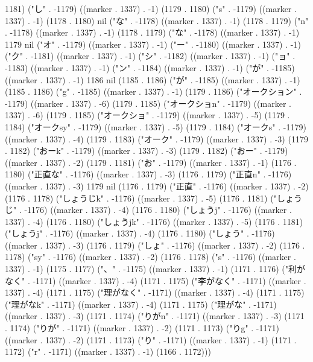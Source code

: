 1181) ("し" . -1179) ((marker . 1337) . -1) (1179 . 1180) ("s" . -1179) ((marker . 1337) . -1) (1178 . 1180) nil ("な" . -1178) ((marker . 1337) . -1) (1178 . 1179) ("n" . -1178) ((marker . 1337) . -1) (1178 . 1179) ("な" . -1178) ((marker . 1337) . -1) 1179 nil ("オ" . -1179) ((marker . 1337) . -1) ("ー" . -1180) ((marker . 1337) . -1) ("ク" . -1181) ((marker . 1337) . -1) ("シ" . -1182) ((marker . 1337) . -1) ("ョ" . -1183) ((marker . 1337) . -1) ("ン" . -1184) ((marker . 1337) . -1) ("が" . -1185) ((marker . 1337) . -1) 1186 nil (1185 . 1186) ("が" . -1185) ((marker . 1337) . -1) (1185 . 1186) ("g" . -1185) ((marker . 1337) . -1) (1179 . 1186) ("オークション" . -1179) ((marker . 1337) . -6) (1179 . 1185) ("オークショn" . -1179) ((marker . 1337) . -6) (1179 . 1185) ("オークショ" . -1179) ((marker . 1337) . -5) (1179 . 1184) ("オークsy" . -1179) ((marker . 1337) . -5) (1179 . 1184) ("オークs" . -1179) ((marker . 1337) . -4) (1179 . 1183) ("オーク" . -1179) ((marker . 1337) . -3) (1179 . 1182) ("おーk" . -1179) ((marker . 1337) . -3) (1179 . 1182) ("おー" . -1179) ((marker . 1337) . -2) (1179 . 1181) ("お" . -1179) ((marker . 1337) . -1) (1176 . 1180) ("正直な" . -1176) ((marker . 1337) . -3) (1176 . 1179) ("正直n" . -1176) ((marker . 1337) . -3) 1179 nil (1176 . 1179) ("正直" . -1176) ((marker . 1337) . -2) (1176 . 1178) ("しょうじk" . -1176) ((marker . 1337) . -5) (1176 . 1181) ("しょうじ" . -1176) ((marker . 1337) . -4) (1176 . 1180) ("しょうj" . -1176) ((marker . 1337) . -4) (1176 . 1180) ("しょうjk" . -1176) ((marker . 1337) . -5) (1176 . 1181) ("しょうj" . -1176) ((marker . 1337) . -4) (1176 . 1180) ("しょう" . -1176) ((marker . 1337) . -3) (1176 . 1179) ("しょ" . -1176) ((marker . 1337) . -2) (1176 . 1178) ("sy" . -1176) ((marker . 1337) . -2) (1176 . 1178) ("s" . -1176) ((marker . 1337) . -1) (1175 . 1177) ("、" . -1175) ((marker . 1337) . -1) (1171 . 1176) ("利がなく" . -1171) ((marker . 1337) . -4) (1171 . 1175) ("李がなく" . -1171) ((marker . 1337) . -4) (1171 . 1175) ("理がなく" . -1171) ((marker . 1337) . -4) (1171 . 1175) ("理がなk" . -1171) ((marker . 1337) . -4) (1171 . 1175) ("理がな" . -1171) ((marker . 1337) . -3) (1171 . 1174) ("りがn" . -1171) ((marker . 1337) . -3) (1171 . 1174) ("りが" . -1171) ((marker . 1337) . -2) (1171 . 1173) ("りg" . -1171) ((marker . 1337) . -2) (1171 . 1173) ("り" . -1171) ((marker . 1337) . -1) (1171 . 1172) ("r" . -1171) ((marker . 1337) . -1) (1166 . 1172)))
